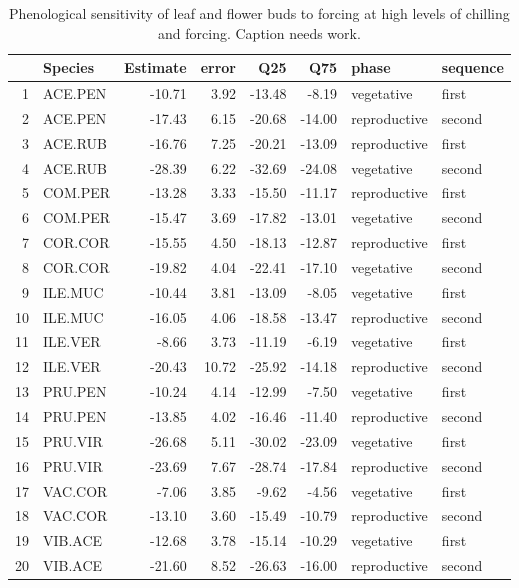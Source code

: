 \documentclass[11pt]{article}\usepackage[]{graphicx}\usepackage[]{color}
\begin{document}
{%
\begin{table}[ht]
\centering
\begin{tabular}{rlrrrrll}
  \hline
 & Species & Estimate & error & Q25 & Q75 & phase & sequence \\ 
  \hline
1 & ACE.PEN & -10.71 & 3.92 & -13.48 & -8.19 & vegetative & first \\ 
  2 & ACE.PEN & -17.43 & 6.15 & -20.68 & -14.00 & reproductive & second \\ 
  3 & ACE.RUB & -16.76 & 7.25 & -20.21 & -13.09 & reproductive & first \\ 
  4 & ACE.RUB & -28.39 & 6.22 & -32.69 & -24.08 & vegetative & second \\ 
  5 & COM.PER & -13.28 & 3.33 & -15.50 & -11.17 & reproductive & first \\ 
  6 & COM.PER & -15.47 & 3.69 & -17.82 & -13.01 & vegetative & second \\ 
  7 & COR.COR & -15.55 & 4.50 & -18.13 & -12.87 & reproductive & first \\ 
  8 & COR.COR & -19.82 & 4.04 & -22.41 & -17.10 & vegetative & second \\ 
  9 & ILE.MUC & -10.44 & 3.81 & -13.09 & -8.05 & vegetative & first \\ 
  10 & ILE.MUC & -16.05 & 4.06 & -18.58 & -13.47 & reproductive & second \\ 
  11 & ILE.VER & -8.66 & 3.73 & -11.19 & -6.19 & vegetative & first \\ 
  12 & ILE.VER & -20.43 & 10.72 & -25.92 & -14.18 & reproductive & second \\ 
  13 & PRU.PEN & -10.24 & 4.14 & -12.99 & -7.50 & vegetative & first \\ 
  14 & PRU.PEN & -13.85 & 4.02 & -16.46 & -11.40 & reproductive & second \\ 
  15 & PRU.VIR & -26.68 & 5.11 & -30.02 & -23.09 & vegetative & first \\ 
  16 & PRU.VIR & -23.69 & 7.67 & -28.74 & -17.84 & reproductive & second \\ 
  17 & VAC.COR & -7.06 & 3.85 & -9.62 & -4.56 & vegetative & first \\ 
  18 & VAC.COR & -13.10 & 3.60 & -15.49 & -10.79 & reproductive & second \\ 
  19 & VIB.ACE & -12.68 & 3.78 & -15.14 & -10.29 & vegetative & first \\ 
  20 & VIB.ACE & -21.60 & 8.52 & -26.63 & -16.00 & reproductive & second \\ 
   \hline
\end{tabular}
\caption{Phenological sensitivity of leaf and flower buds to forcing at high levels of chilling and forcing. Caption needs work.} 
\label{tab:phh}
\end{table}


}
\end{document}

